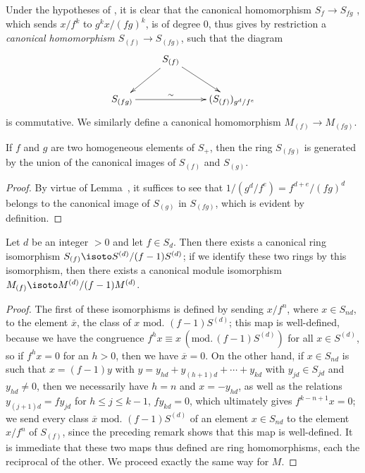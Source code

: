 \begin{env}[2.2.3]
\label{II.2.2.3}
Under the hypotheses of , it is clear that the canonical homomorphism $S_f\to S_{fg}$ , which sends $x/f^k$ to $g^k x/(fg)^k$, is of degree $0$, thus gives by restriction a \emph{canonical homomorphism $S_{(f)}\to S_{(fg)}$}, such that the diagram
\[
  \xymatrix{
    & S_{(f)}\ar[dl]\ar[dr]\\
    S_{(fg)}\ar[rr]^-{\sim} & &
    (S_{(f)})_{g^d/f^e}
  }
\]
is commutative.
We similarly define a canonical homomorphism $M_{(f)}\to M_{(fg)}$.
\end{env}

\begin{lemma}[2.2.4]
\label{II.2.2.4}
If $f$ and $g$ are two homogeneous elements of $S_+$, then the ring $S_{(fg)}$ is generated by the union of the canonical images of $S_{(f)}$ and $S_{(g)}$.
\end{lemma}

\begin{proof}
By virtue of Lemma~, it suffices to see that $1/(g^d/f^e)=f^{d+e}/(fg)^d$ belongs to the canonical image of $S_{(g)}$ in $S_{(fg)}$, which is evident by definition.
\end{proof}

\begin{proposition}[2.2.5]
\label{II.2.2.5}
Let $d$ be an integer $>0$ and let $f\in S_d$.
Then there exists a canonical ring isomorphism $S_{(f)}\isoto S^{(d)}/(f-1)S^{(d)}$;
if we identify these two rings by this isomorphism, then there exists a canonical module isomorphism $M_{(f)}\isoto M^{(d)}/(f-1)M^{(d)}$.
\end{proposition}

\begin{proof}
The first of these isomorphisms is defined by sending $x/f^n$, where $x\in S_{nd}$, to the element $\overline{x}$, the class of $x\text{ mod. }(f-1)S^{(d)}$;
this map is well-defined, because we have the congruence $f^h x\equiv x\,(\text{mod.}\,(f-1)S^{(d)})$ for all $x\in S^{(d)}$, so if $f^h x=0$ for an $h>0$,
then we have $\overline{x}=0$.
On the other hand, if $x\in S_{nd}$ is such that $x=(f-1)y$ with $y=y_{hd}+y_{(h+1)d}+\cdots+y_{kd}$ with $y_{jd}\in S_{jd}$ and $y_{hd}\neq 0$, then we necessarily have $h=n$ and $x=-y_{hd}$, as well as the relations $y_{(j+1)d}=fy_{jd}$ for $h\leq j\leq k-1$, $fy_{kd}=0$, which ultimately gives $f^{k-n+1}x=0$;
we send every class $\overline{x}\text{ mod. }(f-1)S^{(d)}$ of an element $x\in S_{nd}$ to the element $x/f^n$ of $S_{(f)}$, since the preceding remark shows that this map is well-defined.
It is immediate that these two maps thus defined are ring homomorphisms, each the reciprocal of the other.
We proceed exactly the same way for $M$.
\end{proof}

